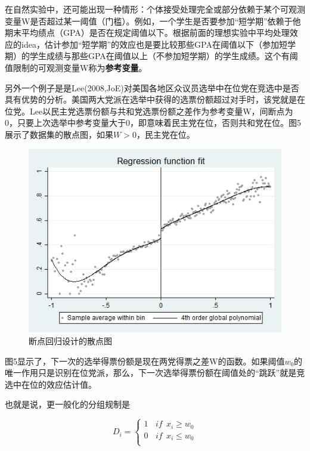 \documentclass[cn,12pt,math=newtx,citestyle=gb7714-2015,bibstyle=gb7714-2015]{elegantbook}
\begin{document}
	在自然实验中，还可能出现一种情形：个体接受处理完全或部分依赖于某个可观测变量W是否超过某一阈值（门槛）。例如，一个学生是否要参加“短学期”依赖于他期末平均绩点（GPA）是否在规定阈值以下。根据前面的理想实验中平均处理效应的idea，估计参加“短学期”的效应也是要比较那些GPA在阈值以下（参加短学期）的学生成绩与那些GPA在阈值以上（不参加短学期）的学生成绩。这个有阈值限制的可观测变量W称为\textbf{参考变量}。
	
	另外一个例子是是Lee(2008,JoE)对美国各地区众议员选举中在位党在竞选中是否具有优势的分析。美国两大党派在选举中获得的选票份额超过对手时，该党就是在位党。Lee以民主党选票份额与共和党选票份额之差作为参考变量W，间断点为0，只要上次选举中参考变量大于0，即意味着民主党在位，否则共和党在位。图5展示了数据集的散点图，如果$W>0$，民主党在位。
	\begin{figure}[htbp]
		\centering
		\includegraphics[width=1\textwidth]{rdgraph.png}
		\caption{断点回归设计的散点图}\label{fig:digit}
	\end{figure}
	
	图5显示了，下一次的选举得票份额是现在两党得票之差W的函数。如果阈值$w_0$的唯一作用只是识别在位党派，那么，下一次选举得票份额在阈值处的“跳跃”就是竞选中在位的效应估计值。
	
	也就是说，更一般化的分组规制是
	
	\begin{equation}
		D_i= \left\{
		\begin{aligned}
			1~~~~if ~~x_i\geq{w_0}  \\
			0~~~~if ~~x_i\le{w_0} \\
		\end{aligned}
		\right.
	\end{equation}
	
\end{document}
